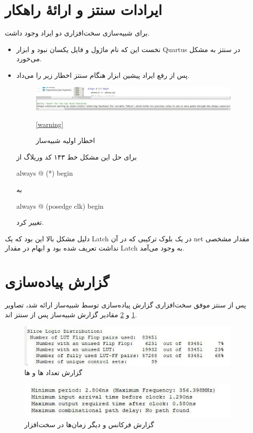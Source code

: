 \section{ایرادات سنتز و ارائهٔ راهکار}
برای شبیه‌سازی سخت‌افزاری دو ایراد وجود داشت.
\begin{itemize}
\item 
نخست این که نام ماژول و فایل یکسان نبود و ابزار 
Quartus 
در سنتز به مشکل می‌خورد.
\item 
پس از رفع ایراد پیشین ابزار هنگام سنتز اخطار زیر را می‌داد.
\begin{figure}[H]
\includegraphics[width = \textwidth]{figs/synthesize/warning.jpg}
\caption{اخطار اولیه شبیه‌ساز}
\ref{warning}
\end{figure}
 برای حل این مشکل خط ۱۴۳ کد وریلاگ از 
 \begin{code}
 	always @ (*) begin
 \end{code}
 به 
 \begin{code}
 	always @ (posedge clk) begin
 \end{code}
 تغییر کرد. 
\end{itemize}

دلیل مشکل بالا این بود که یک Latch در یک بلوک ترکیبی که در آن net مقدار مشخصی نداشت تعریف شده بود و ابهام در مقدار Latch به وجود می‌آمد.


\section{گزارش پیاده‌سازی}
پس از سنتز موفق سخت‌افزاری گزارش پیاده‌سازی توسط شبیه‌ساز ارائه شد، تصاویر 
\ref{statistic_1}
و 
\ref{statistic_2}
مقادیر گزارش‌ شبیه‌ساز پس از سنتز اند.

\begin{figure}[H]
\includegraphics[scale=1]{figs/synthesize/flip_flop_pairs.jpg}
\caption{گزارش تعداد  ها و  ها}
\label{statistic_1}
\end{figure}

\begin{figure}[H]
\includegraphics[scale=1]{figs/synthesize/statistics.jpg}
\caption{گزارش فرکانس و دیگر زمان‌ها در سخت‌افزار}
\label{statistic_2}
\end{figure}
